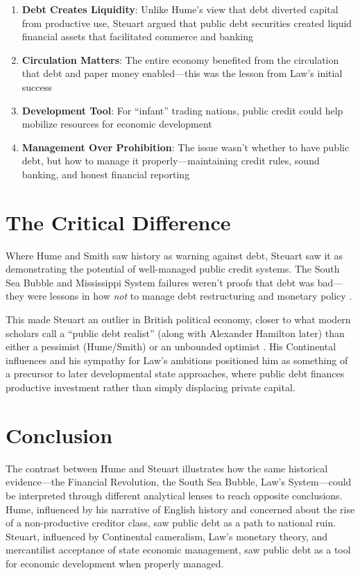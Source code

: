 \documentclass[12pt]{article}
\begin{document}
\begin{enumerate}
\item \textbf{Debt Creates Liquidity}: Unlike Hume's view that debt diverted capital from productive use, Steuart argued that public debt securities created liquid financial assets that facilitated commerce and banking

\item \textbf{Circulation Matters}: The entire economy benefited from the circulation that debt and paper money enabled—this was the lesson from Law's initial success

\item \textbf{Development Tool}: For ``infant'' trading nations, public credit could help mobilize resources for economic development

\item \textbf{Management Over Prohibition}: The issue wasn't whether to have public debt, but how to manage it properly—maintaining credit rules, sound banking, and honest financial reporting
\end{enumerate}

\section{The Critical Difference}

Where Hume and Smith saw history as warning against debt, Steuart saw it as demonstrating the potential of well-managed public credit systems. The South Sea Bubble and Mississippi System failures weren't proofs that debt was bad—they were lessons in how \textit{not} to manage debt restructuring and monetary policy \citep{menudo2019}.

This made Steuart an outlier in British political economy, closer to what modern scholars call a ``public debt realist'' (along with Alexander Hamilton later) than either a pessimist (Hume/Smith) or an unbounded optimist \citep{salsman2017}. His Continental influences and his sympathy for Law's ambitions positioned him as something of a precursor to later developmental state approaches, where public debt finances productive investment rather than simply displacing private capital.

\section{Conclusion}

The contrast between Hume and Steuart illustrates how the same historical evidence—the Financial Revolution, the South Sea Bubble, Law's System—could be interpreted through different analytical lenses to reach opposite conclusions. Hume, influenced by his narrative of English history and concerned about the rise of a non-productive creditor class, saw public debt as a path to national ruin. Steuart, influenced by Continental cameralism, Law's monetary theory, and mercantilist acceptance of state economic management, saw public debt as a tool for economic development when properly managed.
\end{document}

